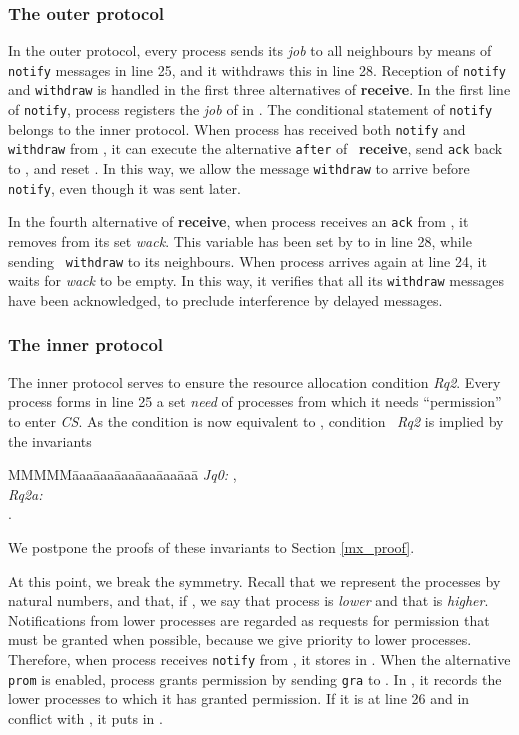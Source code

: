 \documentclass[10pt]{article} \usepackage[english]{babel}
\newenvironment{tab}{\begin{tabbing}
MMMMM\=aaa\=aaa\=aaa\=aaa\=aaa\=aaa\= \kill}{\end{tabbing}}
\def\S #1/{\mbox {\textsl{#1}}}
\def\B #1/{\mbox {\textbf{#1}}}
\def\T #1/{\mbox {\texttt{#1}}}
\begin{document}
\subsubsection{The outer protocol } \label{introOuter}

In the outer protocol, every process  sends its \S job/ to all
neighbours by means of \T notify/ messages in line 25, and it
withdraws this in line 28. Reception of \T notify/ and \T withdraw/ is
handled in the first three alternatives of \B receive/.  In the first
line of \T notify/, process  registers the \S job/ of  in .  The conditional statement of \T notify/ belongs to the
inner protocol.  When process  has received both \T notify/ and \T
withdraw/ from , it can execute the alternative \T after/ of \B
receive/, send \T ack/ back to , and reset .  In this way, we allow the message \T withdraw/ to arrive
before \T notify/, even though it was sent later.

In the fourth alternative of \B receive/, when process  receives an
\T ack/ from , it removes  from its set \S wack/. This variable
has been set by  to  in line 28, while sending \T
withdraw/ to its neighbours.  When process  arrives again at line
24, it waits for \S wack/ to be empty. In this way, it verifies that
all its \T withdraw/ messages have been acknowledged, to preclude
interference by delayed messages.

\subsubsection{The inner protocol} \label{inner}

The inner protocol serves to ensure the resource allocation condition
\S Rq2/.  Every process forms in line 25 a set \S need/ of processes
from which it needs ``permission'' to enter \S CS/.  As the condition
 is now equivalent to , condition \S
Rq2/ is implied by the invariants
\begin{tab}
\S Jq0:/ \>  ,\\
\S Rq2a:/ \> \\
\>  .
\end{tab}
We postpone the proofs of these invariants to Section \ref{mx_proof}.

At this point, we break the symmetry. Recall that we represent the
processes by natural numbers, and that, if , we say that process
 is \emph{lower} and that  is \emph{higher}.  
Notifications from lower processes are regarded as requests for
permission that must be granted when possible, because we give priority
to lower processes. Therefore, when process
 receives \T notify/ from , it stores  in .
When the alternative \T prom/ is enabled, process  grants
permission by sending \T gra/ to .  In , it records the
lower processes to which it has granted permission. If it is at line
26 and in conflict with , it puts  in .
\end{document}
